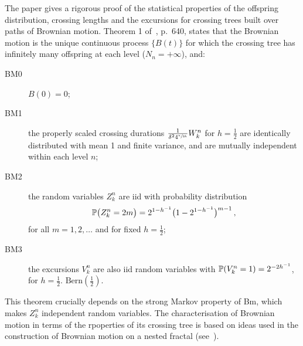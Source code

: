 The paper \cite{ECP1673} gives a rigorous proof of the statistical properties of
the offspring distribution, crossing lengths and the excursions for crossing trees
built over paths of Brownian motion. Theorem 1 of~\cite{ECP1673}, p.~640, states
that the Brownian motion is the unique continuous process $\{B(t)\}$ for which the
crossing tree has infinitely many offspring at each level ($N_n = +\infty$), and:
\begin{description}
    \item[BM0] $B(0) = 0$;
    \item[BM1] the properly scaled crossing durations $\tfrac{1}{\delta^2 4^{\sfrac{n}{2h}}} W_k^n$
    for $h = \tfrac{1}{2}$ are identically distributed with mean 1 and finite variance,
    and are mutually independent within each level $n$;
    \item[BM2] the random variables $Z_k^n$ are iid with probability distribution
    \[ \mathbb{P}\bigl(Z_k^n=2m\bigr) = 2^{1-h^{-1}}\bigl(1-2^{1-h^{-1}}\bigr)^{m-1} \,,\]
    for all $m=1,2,\ldots$ and for fixed $h=\tfrac{1}{2}$;
    \item[BM3] the excursions $V_k^n$ are also iid random variables with 
    $\mathbb{P}( V_k^n = 1 ) = 2^{-2h^{-1}}$, for $h = \tfrac{1}{2}$.
    $\text{Bern}(\tfrac{1}{2})$.
\end{description}
This theorem crucially depends on the strong Markov property of Bm, which makes $Z_k^n$
independent random variables. The characterisation of Brownian motion in terms of
the rpoperties of its crossing tree is based on ideas used in the construction of
Brownian motion on a nested fractal (see~\cite{BarlowPerkins88}).


